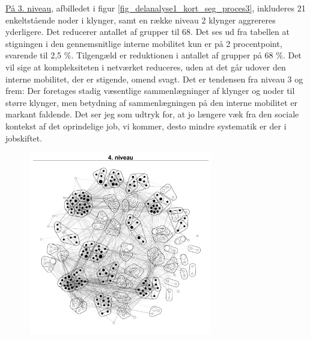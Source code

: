 \underline{På 3. niveau}, afbilledet i figur \ref{fig_delanalyse1_kort_seg_proces3}, inkluderes 21 enkeltstående noder i klynger, samt en række niveau 2 klynger aggrereres yderligere. Det reducerer antallet af grupper til 68. Det ses ud fra tabellen at stigningen i den gennemsnitlige interne mobilitet kun er på 2 procentpoint, svarende til 2,5 \%. Tilgengæld er reduktionen i antallet af grupper på 68 \%. Det vil sige at kompleksiteten i netværket reduceres, uden at det går udover den interne mobilitet, der er stigende, omend svagt. Det er tendensen fra niveau 3 og frem: Der foretages stadig væsentlige sammenlægninger af klynger og noder til større klynger, men betydning af sammenlægningen på den interne mobilitet er markant faldende. Det ser jeg som udtryk for, at jo længere væk fra den sociale kontekst af det oprindelige job, vi kommer, desto mindre systematik er der i jobskiftet.

\begin{figure}
  \vspace{-20pt}
  \begin{center}
    \includegraphics[width=8cm]{fig/netvaerkskort/kort_seg_proces4.pdf}
   \caption{}
   \label{fig_delanalyse1_kort_seg_proces4}
  \end{center}
  \vspace{-20pt}
\end{figure}

